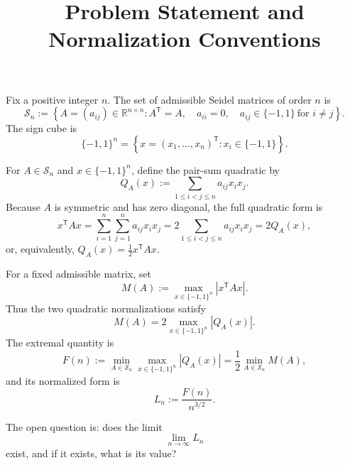 \documentclass[11pt]{article}
\title{Problem Statement and Normalization Conventions}
\author{}
\date{}
\begin{document}
\maketitle

Fix a positive integer $n$.  The set of admissible Seidel matrices of
order $n$ is
\[
  \mathcal{S}_n
  :=
  \left\{
    A=(a_{ij})\in\mathbb{R}^{n\times n}:
    A^{\mathsf T}=A,\quad
    a_{ii}=0,\quad
    a_{ij}\in\{-1,1\}\ \text{for }i\ne j
  \right\}.
\]
The sign cube is
\[
  {\{-1,1\}}^{n}
  =
  \left\{x={(x_1,\ldots,x_n)}^{\mathsf T}:x_i\in\{-1,1\}\right\}.
\]

For $A\in\mathcal{S}_n$ and $x\in{\{-1,1\}}^{n}$, define the pair-sum
quadratic by
\[
  Q_A(x):=\sum_{1\le i<j\le n}a_{ij}x_i x_j.
\]
Because $A$ is symmetric and has zero diagonal, the full quadratic form is
\[
  x^{\mathsf T}Ax
  =\sum_{i=1}^n\sum_{j=1}^n a_{ij}x_i x_j
  =2\sum_{1\le i<j\le n}a_{ij}x_i x_j
  =2Q_A(x),
\]
or, equivalently, $Q_A(x)=\tfrac12 x^{\mathsf T}Ax$.

For a fixed admissible matrix, set
\[
  M(A):=\max_{x\in{\{-1,1\}}^{n}}\left|x^{\mathsf T}Ax\right|.
\]
Thus the two quadratic normalizations satisfy
\[
  M(A)
  =2\max_{x\in{\{-1,1\}}^{n}}|Q_A(x)|.
\]
The extremal quantity is
\[
  F(n)
  :=\min_{A\in\mathcal{S}_n}
       \max_{x\in{\{-1,1\}}^{n}}|Q_A(x)|
  =\frac12\min_{A\in\mathcal{S}_n}M(A),
\]
and its normalized form is
\[
  L_n:=\frac{F(n)}{n^{3/2}}.
\]

The open question is: does the limit
\[
  \lim_{n\to\infty}L_n
\]
exist, and if it exists, what is its value?
\end{document}
